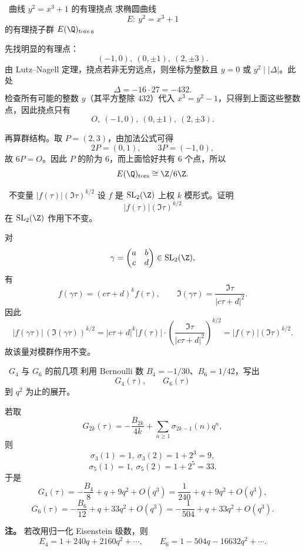 \begin{problem}{\easy\ 曲线 $y^2=x^3+1$ 的有理挠点}
求椭圆曲线
\[
E:\ y^2=x^3+1
\]
的有理挠子群 $E(\Q)_{\mathrm{tors}}$。
\end{problem}
\begin{solution}
先找明显的有理点：
\[
(-1,0),\ (0,\pm1),\ (2,\pm3).
\]
由 Lutz--Nagell 定理，挠点若非无穷远点，则坐标为整数且 $y=0$ 或 $y^2\mid |\Delta|$。此处
\[
\Delta=-16\cdot 27=-432.
\]
检查所有可能的整数 $y$（其平方整除 $432$）代入 $x^3=y^2-1$，只得到上面这些整数点，因此挠点只有
\[
O,\ (-1,0),\ (0,\pm1),\ (2,\pm3).
\]

再算群结构。取 $P=(2,3)$，由加法公式可得
\[
2P=(0,1),\qquad 3P=(-1,0),
\]
故 $6P=O$。因此 $P$ 的阶为 $6$，而上面恰好共有 $6$ 个点，所以
\[
E(\Q)_{\mathrm{tors}}\cong \Z/6\Z.
\]
\end{solution}

\begin{problem}{\easy\ 不变量 $|f(\tau)|(\Im\tau)^{k/2}$}
设 $f$ 是 $\mathrm{SL}_2(\Z)$ 上权 $k$ 模形式。证明
\[
|f(\tau)|(\Im\tau)^{k/2}
\]
在 $\mathrm{SL}_2(\Z)$ 作用下不变。
\end{problem}
\begin{solution}
对
\[
\gamma=\begin{pmatrix}a&b\\c&d\end{pmatrix}\in \mathrm{SL}_2(\Z),
\]
有
\[
f(\gamma\tau)=(c\tau+d)^k f(\tau),
\qquad
\Im(\gamma\tau)=\frac{\Im\tau}{|c\tau+d|^2}.
\]
因此
\[
|f(\gamma\tau)|\,(\Im(\gamma\tau))^{k/2}
=|c\tau+d|^k |f(\tau)|\cdot
\left(\frac{\Im\tau}{|c\tau+d|^2}\right)^{k/2}
=|f(\tau)|(\Im\tau)^{k/2}.
\]
故该量对模群作用不变。
\end{solution}

\begin{problem}{\easy\ $G_4$ 与 $G_6$ 的前几项}
利用 Bernoulli 数 $B_4=-1/30$、$B_6=1/42$，写出
\[
G_4(\tau),\qquad G_6(\tau)
\]
到 $q^2$ 为止的展开。
\end{problem}
\begin{solution}
若取
\[
G_{2k}(\tau)=-\frac{B_{2k}}{4k}+\sum_{n\ge1}\sigma_{2k-1}(n)q^n,
\]
则
\[
\sigma_3(1)=1,\ \sigma_3(2)=1+2^3=9,
\]
\[
\sigma_5(1)=1,\ \sigma_5(2)=1+2^5=33.
\]
于是
\[
G_4(\tau)= -\frac{B_4}{8}+q+9q^2+O(q^3)
=\frac1{240}+q+9q^2+O(q^3),
\]
\[
G_6(\tau)= -\frac{B_6}{12}+q+33q^2+O(q^3)
=-\frac1{504}+q+33q^2+O(q^3).
\]

\textbf{注。} 若改用归一化 Eisenstein 级数，则
\[
E_4=1+240q+2160q^2+\cdots,\qquad
E_6=1-504q-16632q^2+\cdots.
\]
\end{solution}

